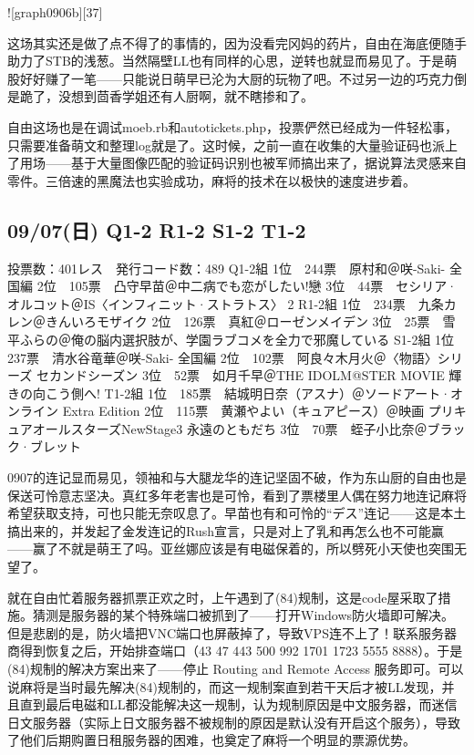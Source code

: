 ![graph0906b][37]

这场其实还是做了点不得了的事情的，因为没看完冈妈的药片，自由在海底便随手助力了STB的浅葱。当然隔壁LL也有同样的心思，逆转也就显而易见了。于是萌股好好赚了一笔——只能说日萌早已沦为大厨的玩物了吧。不过另一边的巧克力倒是跪了，没想到茴香学姐还有人厨啊，就不瞎掺和了。

自由这场也是在调试moeb.rb和autotickets.php，投票俨然已经成为一件轻松事，只需要准备萌文和整理log就是了。这时候，之前一直在收集的大量验证码也派上了用场——基于大量图像匹配的验证码识别也被军师搞出来了，据说算法灵感来自零件。三倍速的黑魔法也实验成功，麻将的技术在以极快的速度进步着。

\subsection{09/07(日) Q1-2 R1-2 S1-2 T1-2}

    投票数：401レス　発行コード数：489
    Q1-2組
    1位　244票　原村和＠咲-Saki- 全国編
    2位　105票　凸守早苗＠中二病でも恋がしたい!戀
    3位　44票　セシリア·オルコット＠IS〈インフィニット·ストラトス〉 2
    R1-2組
    1位　234票　九条カレン＠きんいろモザイク
    2位　126票　真紅＠ローゼンメイデン
    3位　25票　雪平ふらの＠俺の脳内選択肢が、学園ラブコメを全力で邪魔している
    S1-2組
    1位　237票　清水谷竜華＠咲-Saki- 全国編
    2位　102票　阿良々木月火＠〈物語〉シリーズ セカンドシーズン
    3位　52票　如月千早＠THE IDOLM@STER MOVIE 輝きの向こう側へ!
    T1-2組
    1位　185票　結城明日奈（アスナ）＠ソードアート·オンライン Extra Edition
    2位　115票　黄瀬やよい（キュアピース）＠映画 プリキュアオールスターズNewStage3 永遠のともだち
    3位　70票　蛭子小比奈＠ブラック·ブレット

0907的连记显而易见，领袖和与大腿龙华的连记坚固不破，作为东山厨的自由也是保送可怜意志坚决。真红多年老害也是可怜，看到了票楼里人偶在努力地连记麻将希望获取支持，可也只能无奈叹息了。早苗也有和可怜的“デス”连记——这是本土搞出来的，并发起了金发连记的Rush宣言，只是对上了乳和再怎么也不可能赢——赢了不就是萌王了吗。亚丝娜应该是有电磁保着的，所以劈死小天使也突围无望了。

就在自由忙着服务器抓票正欢之时，上午遇到了(84)规制，这是code屋采取了措施。猜测是服务器的某个特殊端口被抓到了——打开Windows防火墙即可解决。但是悲剧的是，防火墙把VNC端口也屏蔽掉了，导致VPS连不上了！联系服务器商得到恢复之后，开始排查端口（43 47 443 500 992 1701 1723 5555 8888）。于是(84)规制的解决方案出来了——停止 Routing and Remote Access 服务即可。可以说麻将是当时最先解决(84)规制的，而这一规制案直到若干天后才被LL发现，并且直到最后电磁和LL都没能解决这一规制，认为规制原因是中文服务器，而迷信日文服务器（实际上日文服务器不被规制的原因是默认没有开启这个服务），导致了他们后期购置日租服务器的困难，也奠定了麻将一个明显的票源优势。

